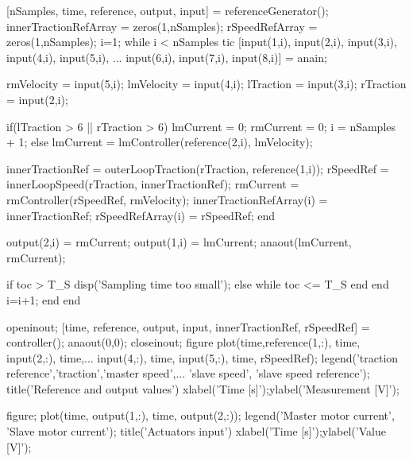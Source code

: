 \begin{matlabcode}
  [nSamples, time, reference, output, input] = referenceGenerator();
  innerTractionRefArray = zeros(1,nSamples);
  rSpeedRefArray = zeros(1,nSamples);
  i=1;
  while i < nSamples
    tic %
    [input(1,i), input(2,i), input(3,i), input(4,i), input(5,i), ...
      input(6,i), input(7,i), input(8,i)]  = anain; %

    rmVelocity = input(5,i); %
    lmVelocity = input(4,i);
    lTraction = input(3,i);
    rTraction = input(2,i);

    if(lTraction > 6 || rTraction > 6) %
      lmCurrent = 0;
      rmCurrent = 0;
      i = nSamples + 1;
    else
      lmCurrent = lmController(reference(2,i), lmVelocity);

      innerTractionRef = outerLoopTraction(rTraction, reference(1,i));
      rSpeedRef = innerLoopSpeed(rTraction, innerTractionRef);
      rmCurrent = rmController(rSpeedRef, rmVelocity);
      innerTractionRefArray(i) = innerTractionRef;
      rSpeedRefArray(i) = rSpeedRef;
    end

    output(2,i) = rmCurrent;
    output(1,i) = lmCurrent;
    anaout(lmCurrent, rmCurrent);

    if toc > T_S
      disp('Sampling time too small');%
    else
      while toc <= T_S
      end
    end
    i=i+1;
  end
end
\end{matlabcode}
\clearpage
\begin{matlabcode}
openinout;
[time, reference, output, input, innerTractionRef, rSpeedRef] = controller();
anaout(0,0);
closeinout;
figure %
plot(time,reference(1,:), time, input(2,:), time,...
  input(4,:), time, input(5,:), time, rSpeedRef); %
legend('traction reference','traction','master speed',...
  'slave speed', 'slave speed reference');
title('Reference and output values')
xlabel('Time [s]');ylabel('Measurement [V]');

figure;
plot(time, output(1,:), time, output(2,:));
legend('Master motor current', 'Slave motor current');
title('Actuators input')
xlabel('Time [s]');ylabel('Value [V]');
\end{matlabcode}
